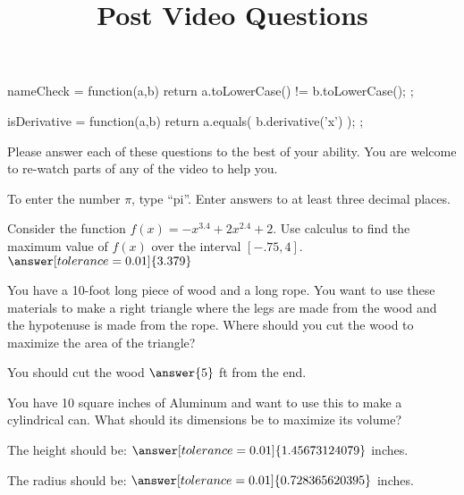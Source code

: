 \documentclass[handout]{ximera}
\title{Post Video Questions}
\begin{document}
\begin{abstract}
\end{abstract}


\maketitle

\begin{javascript}
nameCheck = function(a,b) {
    return a.toLowerCase() != b.toLowerCase();
  };

isDerivative = function(a,b) {
    return a.equals( b.derivative('x') );
  };

\end{javascript}

Please answer each of these questions to the best of your ability. You are welcome to re-watch parts of any of the video to help you.

To enter the number $\pi$, type ``pi''. Enter answers to at least three decimal places.

\begin{problem}
Consider the function $f(x)=-x^{3.4}+2x^{2.4}+2$. Use calculus to find the maximum value of $f(x)$ over the interval $[-.75,4]$.
$\answer[tolerance=0.01]{3.379}$
\end{problem}

\begin{problem}
You have a 10-foot long piece of wood and a long rope. You want to use these materials to make a right triangle where the legs are made from the wood and the hypotenuse is made from the rope. Where should you cut the wood to maximize the area of the triangle?

You should cut the wood $\answer{5}$ ft from the end.
\end{problem}

\begin{problem}
You have 10 square inches of Aluminum and want to use this to make a cylindrical can. What should its dimensions be to maximize its volume?



The height should be: $\answer[tolerance=0.01]{1.45673124079}$ inches.

The radius should be: $\answer[tolerance=0.01]{0.728365620395}$ inches.
\end{problem}
\end{document}
